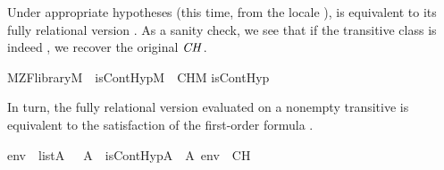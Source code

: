%
%
Under appropriate hypotheses (this time, from the locale ),
    is equivalent to its fully relational version .
    As a sanity check, we see that if the transitive class is indeed \isa{{\isasymV}},
    we recover the original $\mathit{CH}$.%
\begin{isabelle}%
M{\isacharunderscore}{\kern0pt}ZF{\isacharunderscore}{\kern0pt}library{\isacharparenleft}{\kern0pt}M{\isacharparenright}{\kern0pt}\ {\isasymLongrightarrow}\ is{\isacharunderscore}{\kern0pt}ContHyp{\isacharparenleft}{\kern0pt}M{\isacharparenright}{\kern0pt}\ {\isasymlongleftrightarrow}\ CH\isactrlbsup M\isactrlesup \isasep\isanewline%
is{\isacharunderscore}{\kern0pt}ContHyp{\isacharparenleft}{\kern0pt}{\isasymV}{\isacharparenright}{\kern0pt}\ {\isasymlongleftrightarrow}\ {\isasymaleph}\isactrlesub \ {\isacharequal}{\kern0pt}\ {}\isactrlbsup {\isasymup}{\isasymaleph}\isactrlesub \isactrlesup %
\end{isabelle}%
In turn, the fully relational version evaluated on a nonempty
    transitive  is equivalent to the satisfaction of the
    first-order formula .%
\begin{isabelle}%
{\isasymlbrakk}env\ {\isasymin}\ list{\isacharparenleft}{\kern0pt}A{\isacharparenright}{\kern0pt}{\isacharsemicolon}{\kern0pt}\ {}\ {\isasymin}\ A{\isasymrbrakk}\ {\isasymLongrightarrow}\ is{\isacharunderscore}{\kern0pt}ContHyp{\isacharparenleft}{\kern0pt}{\isacharhash}{\kern0pt}{\isacharhash}{\kern0pt}A{\isacharparenright}{\kern0pt}\ {\isasymlongleftrightarrow}\ A{\isacharcomma}{\kern0pt}\ env\ {\isasymTurnstile}\ {\isasymcdot}CH{\isasymcdot}%
\end{isabelle}%
